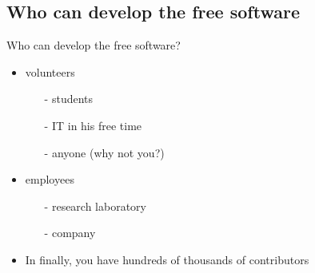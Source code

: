 \documentclass[11pt,hyperref={pdfpagemode=FullScreen}]{beamer}
\begin{document}
\subsection{Who can develop the free software}
\begin{frame}{Who can develop the free software?}
\begin{itemize}
 \item volunteers
\begin{itemize}
 \item [-]students
 \item [-]IT in his free time 
 \item [-]anyone (why not you?)
\end{itemize}
\item employees
\begin{itemize}
 \item [-]research laboratory
 \item [-]company
\end{itemize}
\item In finally, you have hundreds of thousands of contributors
\end{itemize}
\end{frame}
\end{document}
